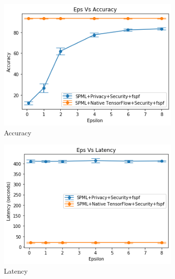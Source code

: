 \begin{figure}
     \begin{subfigure}{0.5\textwidth}
         \includegraphics[width=\textwidth]{images/Training/MnistFLAccuracy.png}
         \caption{Accuracy}
         \label{fig:appendixFLMnistAccuracyTraining}
     \end{subfigure}
     \begin{subfigure}{0.5\textwidth}
         \includegraphics[width=\textwidth]{images/Training/MnistFLLatency.png}
         \caption{Latency}
         \label{fig:appendixFLMnistLatencyTraining}
     \end{subfigure}
        \caption{MNIST Dataset - training - native+hardware Mode - Hardware mode + Fspf with Intel SGX and SCONE}
     \begin{subfigure}{0.5\textwidth}

\end{subfigure}
\end{figure}
